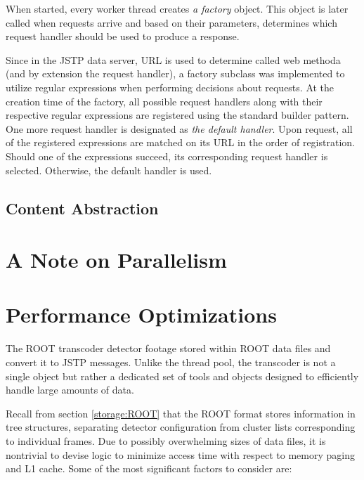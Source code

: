 When started, every worker thread creates \textit{a factory} object. This object is later called when requests arrive and based on their parameters, determines which request handler should be used to produce a response.

Since in the JSTP data server, URL is used to determine called web methoda (and by extension the request handler), a factory subclass was implemented to utilize regular expressions when performing decisions about requests. At the creation time of the factory, all possible request handlers along with their respective regular expressions are registered using the standard builder pattern. One more request handler is designated as \textit{the default handler}. Upon request, all of the registered expressions are matched on its URL in the order of registration. Should one of the expressions succeed, its corresponding request handler is selected. Otherwise, the default handler is used.

\subsection{Content Abstraction}

\section{A Note on Parallelism}

\section{Performance Optimizations}

The ROOT transcoder detector footage stored within ROOT data files and convert it to JSTP messages. Unlike the thread pool, the transcoder is not a single object but rather a dedicated set of tools and objects designed to efficiently handle large amounts of data.

Recall from section \ref{storage:ROOT} that the ROOT format stores information in tree structures, separating detector configuration from cluster lists corresponding to individual frames. Due to possibly overwhelming sizes of data files, it is nontrivial to devise logic to minimize access time with respect to memory paging and L1 cache. Some of the most significant factors to consider are:

